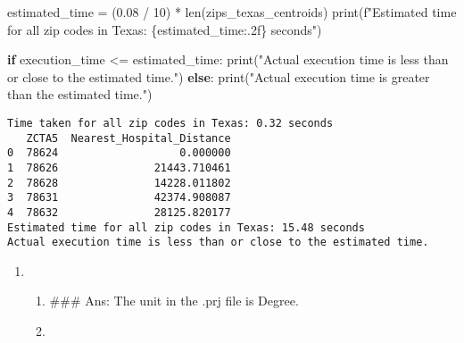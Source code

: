 \documentclass[
  letterpaper,
  DIV=11,
  numbers=noendperiod]{scrartcl}
\newenvironment{Shaded}{\begin{snugshade}}{\end{snugshade}}
\newcommand{\BuiltInTok}[1]{\textcolor[rgb]{0.00,0.23,0.31}{#1}}
\newcommand{\ControlFlowTok}[1]{\textcolor[rgb]{0.00,0.23,0.31}{\textbf{#1}}}
\newcommand{\DecValTok}[1]{\textcolor[rgb]{0.68,0.00,0.00}{#1}}
\newcommand{\FloatTok}[1]{\textcolor[rgb]{0.68,0.00,0.00}{#1}}
\newcommand{\NormalTok}[1]{\textcolor[rgb]{0.00,0.23,0.31}{#1}}
\newcommand{\OperatorTok}[1]{\textcolor[rgb]{0.37,0.37,0.37}{#1}}
\newcommand{\SpecialCharTok}[1]{\textcolor[rgb]{0.37,0.37,0.37}{#1}}
\newcommand{\SpecialStringTok}[1]{\textcolor[rgb]{0.13,0.47,0.30}{#1}}
\newcommand{\StringTok}[1]{\textcolor[rgb]{0.13,0.47,0.30}{#1}}
\begin{document}
\begin{Shaded}
\begin{Highlighting}[]
\NormalTok{estimated\_time }\OperatorTok{=}\NormalTok{ (}\FloatTok{0.08} \OperatorTok{/} \DecValTok{10}\NormalTok{) }\OperatorTok{*} \BuiltInTok{len}\NormalTok{(zips\_texas\_centroids)}
\BuiltInTok{print}\NormalTok{(}\SpecialStringTok{f"Estimated time for all zip codes in Texas: }\SpecialCharTok{\{}\NormalTok{estimated\_time}\SpecialCharTok{:.2f\}}\SpecialStringTok{ seconds"}\NormalTok{)}

\ControlFlowTok{if}\NormalTok{ execution\_time }\OperatorTok{\textless{}=}\NormalTok{ estimated\_time:}
    \BuiltInTok{print}\NormalTok{(}\StringTok{"Actual execution time is less than or close to the estimated time."}\NormalTok{)}
\ControlFlowTok{else}\NormalTok{:}
    \BuiltInTok{print}\NormalTok{(}\StringTok{"Actual execution time is greater than the estimated time."}\NormalTok{)}
\end{Highlighting}
\end{Shaded}

\begin{verbatim}
Time taken for all zip codes in Texas: 0.32 seconds
   ZCTA5  Nearest_Hospital_Distance
0  78624                   0.000000
1  78626               21443.710461
2  78628               14228.011802
3  78631               42374.908087
4  78632               28125.820177
Estimated time for all zip codes in Texas: 15.48 seconds
Actual execution time is less than or close to the estimated time.
\end{verbatim}

\begin{enumerate}
\def\labelenumi{\arabic{enumi}.}
\setcounter{enumi}{4}
\item
  \begin{enumerate}
  \def\labelenumii{\alph{enumii}.}
  \item
    \#\#\# Ans: The unit in the .prj file is Degree.
  \item
  \end{enumerate}
\end{enumerate}
\end{document}
